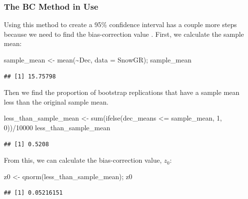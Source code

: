\documentclass[12pt]{article}
\newenvironment{Shaded}{\begin{snugshade}}{\end{snugshade}}
\newcommand{\AttributeTok}[1]{\textcolor[rgb]{0.77,0.63,0.00}{#1}}
\newcommand{\DecValTok}[1]{\textcolor[rgb]{0.00,0.00,0.81}{#1}}
\newcommand{\FunctionTok}[1]{\textcolor[rgb]{0.00,0.00,0.00}{#1}}
\newcommand{\NormalTok}[1]{#1}
\newcommand{\OtherTok}[1]{\textcolor[rgb]{0.56,0.35,0.01}{#1}}
\newcommand{\SpecialCharTok}[1]{\textcolor[rgb]{0.00,0.00,0.00}{#1}}
\begin{document}
\hypertarget{the-bc-method-in-use}{%
\subsubsection{The BC Method in Use}\label{the-bc-method-in-use}}

Using this method to create a 95\% confidence interval has a couple more
steps because we need to find the bias-correction value
\citep{EfronCasi}. First, we calculate the sample mean:

\begin{Shaded}
\begin{Highlighting}[]
\NormalTok{sample\_mean }\OtherTok{\textless{}{-}} \FunctionTok{mean}\NormalTok{(}\SpecialCharTok{\textasciitilde{}}\NormalTok{Dec, }\AttributeTok{data =}\NormalTok{ SnowGR); sample\_mean}
\end{Highlighting}
\end{Shaded}

\begin{verbatim}
## [1] 15.75798
\end{verbatim}

Then we find the proportion of bootstrap replications that have a sample
mean less than the original sample mean.

\begin{Shaded}
\begin{Highlighting}[]
\NormalTok{less\_than\_sample\_mean }\OtherTok{\textless{}{-}} \FunctionTok{sum}\NormalTok{(}\FunctionTok{ifelse}\NormalTok{(dec\_means }\SpecialCharTok{\textless{}=}\NormalTok{ sample\_mean, }\DecValTok{1}\NormalTok{, }\DecValTok{0}\NormalTok{))}\SpecialCharTok{/}\DecValTok{10000}
\NormalTok{less\_than\_sample\_mean}
\end{Highlighting}
\end{Shaded}

\begin{verbatim}
## [1] 0.5208
\end{verbatim}

From this, we can calculate the bias-correction value, \(z_0\):

\begin{Shaded}
\begin{Highlighting}[]
\NormalTok{z0 }\OtherTok{\textless{}{-}} \FunctionTok{qnorm}\NormalTok{(less\_than\_sample\_mean); z0}
\end{Highlighting}
\end{Shaded}

\begin{verbatim}
## [1] 0.05216151
\end{verbatim}
\end{document}
